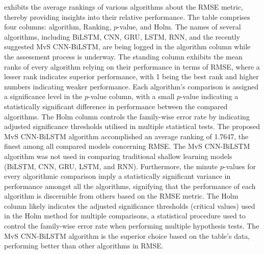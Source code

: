    exhibits the average rankings of various algorithms about the RMSE metric,  thereby providing insights into their relative performance. The table comprises four columns: algorithm,  Ranking,  $p$-value,  and Holm. The names of several algorithms,  including BiLSTM,  CNN,  GRU,  LSTM,  RNN,  and the recently suggested MvS CNN-BiLSTM,  are being logged in the algorithm column while the assessment process is underway. The standing column exhibits the mean ranks of every algorithm relying on their performance in terms of RMSE,  where a lesser rank indicates superior performance, with 1 being the best rank and higher numbers indicating weaker performance. Each algorithm's comparison is assigned a significance level in the $p$-value column,  with a small $p$-value indicating a statistically significant difference in performance between the compared algorithms. The Holm column controls the family-wise error rate by indicating adjusted significance thresholds utilised in multiple statistical tests. The proposed MvS CNN-BiLSTM algorithm accomplished an average ranking of 1.7647, the finest among all compared models concerning RMSE. The MvS CNN-BiLSTM algorithm was not used in comparing traditional shallow learning models (BiLSTM,  CNN,  GRU,  LSTM,  and RNN). Furthermore,  the minute $p$-values for every algorithmic comparison imply a statistically significant variance in performance amongst all the algorithms,  signifying that the performance of each algorithm is discernible from others based on the RMSE metric. The Holm column likely indicates the adjusted significance thresholds (critical values) used in the Holm method for multiple comparisons, a statistical procedure used to control the family-wise error rate when performing multiple hypothesis tests. The MvS CNN-BiLSTM algorithm is the superior choice based on the table's data,  performing better than other algorithms in RMSE.







